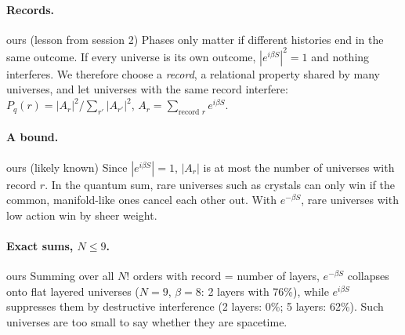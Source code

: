 \documentclass[11pt,a4paper]{article}
\newcommand{\tagbox}[2]{\textsf{\scriptsize\colorbox{#1!12}{\textcolor{#1!70!black}{#2}}}}
\newcommand{\ours}{\tagbox{orange}{ours}}
\begin{document}
\paragraph{Records.} \ours{} (lesson from session 2) Phases only matter if different histories end in the same outcome. If every universe is its own outcome, $|e^{i\beta S}|^2=1$ and nothing interferes. We therefore choose a \emph{record}, a relational property shared by many universes, and let universes with the same record interfere: $P_q(r)=|A_r|^2/\sum_{r'}|A_{r'}|^2$, $A_r=\sum_{\text{record }r}e^{i\beta S}$.

\paragraph{A bound.} \ours{} (likely known) Since $|e^{i\beta S}|=1$, $|A_r|$ is at most the number of universes with record $r$. In the quantum sum, rare universes such as crystals can only win if the common, manifold-like ones cancel each other out. With $e^{-\beta S}$, rare universes with low action win by sheer weight.

\paragraph{Exact sums, $N\le9$.} \ours{} Summing over all $N!$ orders with record = number of layers, $e^{-\beta S}$ collapses onto flat layered universes ($N=9$, $\beta=8$: 2 layers with 76\%), while $e^{i\beta S}$ suppresses them by destructive interference (2 layers: 0\%; 5 layers: 62\%). Such universes are too small to say whether they are spacetime.
\end{document}
